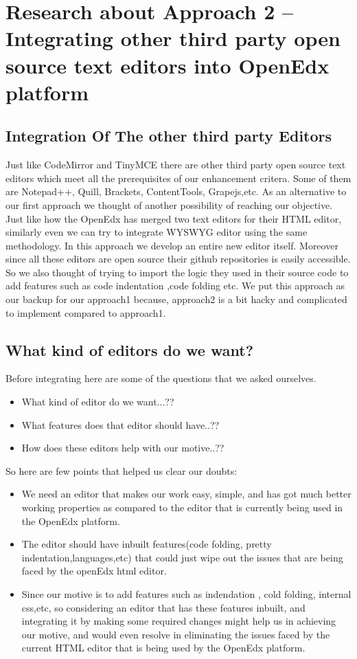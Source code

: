 \chapter{Research about Approach 2 – Integrating other third party
open source text editors into OpenEdx platform }
\section{Integration Of The other third party Editors}
Just like CodeMirror and TinyMCE there are other third party open source text editors
which meet all the prerequisites of our enhancement critera. Some of them are Notepad++,
Quill, Brackets, ContentTools, Grapejs,etc. As an alternative to our first approach we
thought of another possibility of reaching our objective. Just like how the OpenEdx has
merged two text editors for their HTML editor, similarly even we can try to integrate
WYSWYG editor using the same methodology. In this approach we develop an entire new
editor itself. Moreover since all these editors are open source their github repositories is
easily accessible. So we also thought of trying to import the logic they used in their source
code to add features such as code indentation ,code folding etc. We put this approach as our
backup for our approach1 because, approach2 is a bit hacky and complicated to implement
compared to approach1. 
\section{What kind of editors do we want?}  
Before integrating here are some of the questions that we asked ourselves. \newline
\begin{itemize}
\item What kind of editor do we want...??
\item What features does that editor should have..??
\item How does these editors help with our motive..?? \newline 
\end{itemize}
So here are few points that helped us clear our doubts: \newline
\begin{itemize}
\item We need an editor that makes our work easy, simple, and has got much better working
properties as compared to the editor that is currently being used in the OpenEdx platform.
\item The editor should have inbuilt features(code folding, pretty indentation,languages,etc) that
could just wipe out the issues that are being faced by the openEdx html editor.
\item Since our motive is to add features such as indendation , cold folding, internal css,etc, so
considering an editor that has these features inbuilt, and integrating it by making some
required changes might help us in achieving our motive, and would even resolve in
eliminating the issues faced by the current HTML editor that is being used by the OpenEdx
platform. \newline
\end{itemize}

